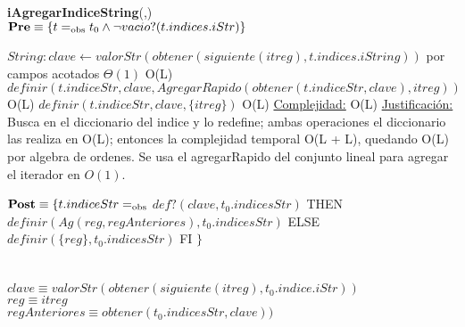 \begin{algorithm}[H]{\textbf{iAgregarIndiceString}(,)}
	{\\ $\textbf{Pre} \equiv \{t =_{\mathrm{obs}} t_0 \land \neg vacio?(t.indices.iStr)\}$}
	\begin{algorithmic}[1]
		\State $String: clave \gets valorStr(obtener(siguiente(itreg),t.indices.iString))$	\Comment por campos acotados $\Theta(1)$
			\Comment O(L)
			\State $definir(t.indiceStr,clave,AgregarRapido(obtener(t.indiceStr,clave),itreg))$ \Comment O(L)
		\Else
			\State $definir(t.indiceStr,clave,\{itreg\})$ \Comment O(L)
		\EndIf
		\medskip
		\Statex \underline{Complejidad:} O(L)
		\Statex \underline{Justificación:} Busca en el diccionario del indice y lo redefine; ambas operaciones el diccionario las realiza en O(L); entonces la complejidad temporal O(L + L), quedando O(L) por algebra de ordenes. Se usa el agregarRapido del conjunto lineal para agregar el iterador en $O(1)$.
	\end{algorithmic}
	{$\textbf{Post} \equiv \{t.indiceStr =_{\mathrm{obs}}$  \IF $def?(clave,t_0.indicesStr)$ THEN $definir(Ag(reg,regAnteriores),t_0.indicesStr)$ ELSE $definir(\{reg\},t_0.indicesStr)$ FI $\}$}\\
	\\ \\
	{$clave \equiv valorStr(obtener(siguiente(itreg),t_0.indice.iStr))$}\\
	{$reg \equiv itreg$} \\
	{$regAnteriores \equiv obtener(t_0.indicesStr,clave))$}
\end{algorithm}

